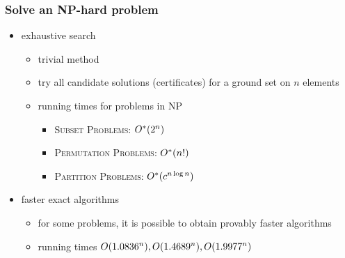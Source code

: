 \begin{frame}
	\frametitle{Solve an NP-hard problem}

	\begin{itemize}
		\item exhaustive search
		      \begin{itemize}
			      \item trivial method
			      \item try all candidate solutions (certificates) for a ground set on $n$ elements
			      \item running times for problems in NP
			            \begin{itemize}
				            \item \textsc{Subset Problems}: $O^*(2^n)$
				            \item \textsc{Permutation Problems}: $O^*(n!)$
				            \item \textsc{Partition Problems}: $O^*(c^{n \log n})$
			            \end{itemize}
		      \end{itemize}
		\item faster exact algorithms
		      \begin{itemize}
			      \item for some problems, it is possible to obtain provably faster algorithms
			      \item running times $O(1.0836^n), O(1.4689^n), O(1.9977^n)$
		      \end{itemize}
	\end{itemize}
\end{frame}


